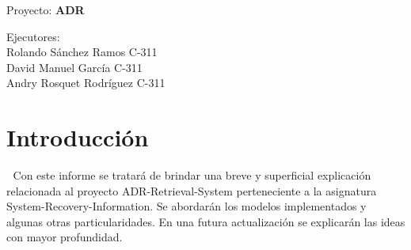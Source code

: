 \documentclass[10pt]{amsart}
\title{}
\author{}
\date{\today}
\begin{document}
	\begin{titlepage}
		\clearpage
		\maketitle
		
		\vspace{3em}
		\begin{center}
			Proyecto: \textbf{ADR} 	
		
		\vspace{12em}
		Ejecutores: \\
		Rolando Sánchez Ramos C-311\\
		David Manuel García C-311\\
		Andry Rosquet Rodríguez C-311
		\end{center}
		\thispagestyle{empty}
	    \vspace{0.7em}
	\end{titlepage}
	\section{Introducción} \textcolor{white}{.}
	Con este informe se tratará de brindar una breve y superficial explicación relacionada al proyecto ADR-Retrieval-System perteneciente a la asignatura System-Recovery-Information. Se abordarán los modelos implementados y algunas otras particularidades. En una futura actualización se explicarán las ideas con mayor profundidad.
	
\end{document}
